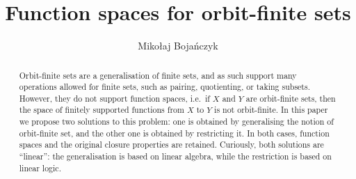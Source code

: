 \documentclass[a4paper,UKenglish,cleveref, autoref, numberwithinsect, thm-restate,anonymous]{lipics-v2021}
\title{Function spaces for orbit-finite sets} %
\author{Miko{\l}aj Boja\'nczyk}{University of Warsaw}{bojan@mimuw.edu.pl}{https://orcid.org/0000-0002-1825-0097}{(Optional) author-specific funding acknowledgements}
\begin{document}
\newcommand{\loli}{\multimap}


\maketitle 
\begin{abstract}
    Orbit-finite sets are a generalisation of finite sets, and as such support many operations allowed for finite sets, such as pairing, quotienting, or taking subsets. However, they do not support function spaces, i.e.~if $X$ and $Y$ are orbit-finite sets, then the space of finitely supported functions from $X$ to $Y$ is not orbit-finite. In this paper we propose two solutions to this problem: one is obtained by generalising the notion of orbit-finite set, and the other one is obtained by restricting it. In both cases, function spaces and the original closure properties are retained. Curiously, both solutions are ``linear'': the generalisation is based on linear algebra, while the restriction is based on linear logic.
\end{abstract}





% 






\appendix




\end{document}
